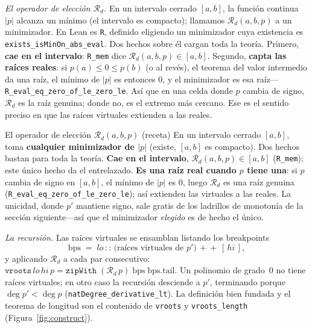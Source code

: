 \documentclass[11pt]{article}
\newcommand{\lean}[1]{\texttt{#1}}
\newcommand{\Rd}{\mathcal{R}}
\begin{document}
\emph{El operador de elecci\'on $\Rd_d$.} En un intervalo cerrado $[a,b]$, la funci\'on continua
$|p|$ alcanza un m\'inimo (el intervalo es compacto); llamamos $\Rd_d(a,b,p)$ a un minimizador. En
Lean es \lean{R}, definido eligiendo un minimizador cuya existencia es \lean{exists\_isMinOn\_abs\_eval}.
Dos hechos sobre \'el cargan toda la teor\'ia. Primero, \textbf{cae en el intervalo}: \lean{R\_mem}
dice $\Rd_d(a,b,p)\in[a,b]$. Segundo, \textbf{capta las ra\'ices reales}: si $p(a)\le 0\le p(b)$ (o al
rev\'es), el teorema del valor intermedio da una ra\'iz, el m\'inimo de $|p|$ es entonces $0$, y el
minimizador es esa ra\'iz---\lean{R\_eval\_eq\_zero\_of\_le\_zero\_le}. As\'i que en una celda donde
$p$ cambia de signo, $\Rd_d$ es la ra\'iz genuina; donde no, es el extremo m\'as cercano. Ese es el
sentido preciso en que las ra\'ices virtuales extienden a las reales.

\begin{recipebox}{El operador de elecci\'on $\Rd_d(a,b,p)$ (receta)}
En un intervalo cerrado $[a,b]$, toma \textbf{cualquier minimizador de $|p|$} (existe, $[a,b]$ es
compacto). Dos hechos bastan para toda la teor\'ia. \textbf{Cae en el intervalo},
$\Rd_d(a,b,p)\in[a,b]$ (\lean{R\_mem}); este \'unico hecho da el entrelazado. \textbf{Es una ra\'iz
real cuando $p$ tiene una}: si $p$ cambia de signo en $[a,b]$, el m\'inimo de $|p|$ es $0$, luego
$\Rd_d$ es una ra\'iz genuina (\lean{R\_eval\_eq\_zero\_of\_le\_zero\_le}); as\'i extienden las
virtuales a las reales. La unicidad, donde $p'$ mantiene signo, sale gratis de los ladrillos de
monoton\'ia de la secci\'on siguiente---as\'i que el minimizador \emph{elegido} es de hecho el \'unico.
\end{recipebox}

\emph{La recursi\'on.} Las ra\'ices virtuales se ensamblan listando los breakpoints
\[
  \mathrm{bps} \;=\; lo \,::\, \big(\text{ra\'ices virtuales de }p'\big) \,+\!\!+\, [\,hi\,],
\]
y aplicando $\Rd_d$ a cada par consecutivo:
$\lean{vroots}\,lo\,hi\,p = \lean{zipWith}\;(\Rd_d\,p)\;\mathrm{bps}\;\mathrm{bps.tail}$. Un polinomio
de grado~$0$ no tiene ra\'ices virtuales; en otro caso la recursi\'on desciende a $p'$, terminando
porque $\deg p' < \deg p$ (\lean{natDegree\_derivative\_lt}). La definici\'on bien fundada y el teorema
de longitud son el contenido de \lean{vroots} y \lean{vroots\_length} (Figura~\ref{fig:construct}).
\end{document}
